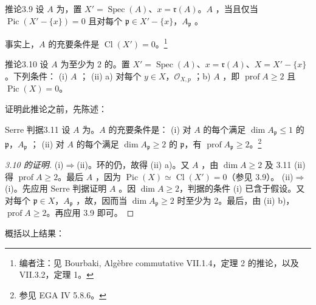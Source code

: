 \begin{SGAresult}{推论}{3.9}
设 $A$ 为，置 $X'=\operatorname{Spec}(A)$、$x=\mathfrak r(A)$。$A$ ，当且仅当 $\operatorname{Pic}(X'-\{x\})=0$ 且对每个 $\mathfrak p\in X'-\{x\}$，$A_{\mathfrak p}$ 。
\end{SGAresult}
事实上，$A$ 的充要条件是 $\operatorname{Cl}(X')=0$。\footnote{编者注：见 Bourbaki, Algèbre commutative VII.1.4，定理 2 的推论，以及 VII.3.2，定理 1。}
\begin{SGAresult}{推论}{3.10}
设 $A$ 为至少为 $2$ 的。置 $X'=\operatorname{Spec}(A)$、$x=\mathfrak r(A)$、$X=X'-\{x\}$。下列条件：
(i) $A$ ；
(ii) a) 对每个 $y\in X$，$\mathcal O_{X,p}$ ；b) $A$ ，即 $\operatorname{prof}A\geq2$ 且 $\operatorname{Pic}(X)=0$。
\end{SGAresult}
证明此推论之前，先陈述：
\begin{SGAresult}{Serre 判据}{3.11}
设 $A$ 为。$A$ 的充要条件是：
(i) 对 $A$ 的每个满足 $\dim A_{\mathfrak p}\leq1$ 的 $\mathfrak p$，$A_{\mathfrak p}$ ；
(ii) 对 $A$ 的每个满足 $\dim A_{\mathfrak p}\geq2$ 的 $\mathfrak p$，有 $\operatorname{prof}A_{\mathfrak p}\geq2$。\footnote{参见 EGA IV 5.8.6。}
\end{SGAresult}
\begin{proof}[3.10 的证明]
(i)$\Rightarrow$(ii)。环的仍，故得 (ii) a)。又 $A$ ，由 $\dim A\geq2$ 及 3.11 (ii) 得 $\operatorname{prof}A\geq2$。最后 $A$ ，因为 $\operatorname{Pic}(X)\simeq\operatorname{Cl}(X')=0$（参见 3.9）。
(ii)$\Rightarrow$(i)。先应用 Serre 判据证明 $A$ 。因 $\dim A\geq2$，判据的条件 (i) 已含于假设。又对每个 $\mathfrak p\in X$，$A_{\mathfrak p}$ ，故，因而当 $\dim A_{\mathfrak p}\geq2$ 时至少为 $2$。最后，由 (ii) b)，$\operatorname{prof}A\geq2$。再应用 3.9 即可。
\end{proof}
概括以上结果：
